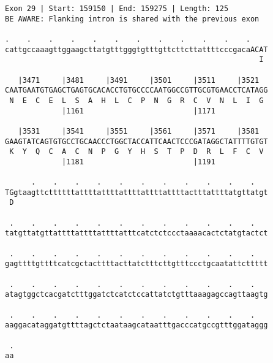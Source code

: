 \documentclass{article}
\begin{document}
\begin{Verbatim}
Exon 29 | Start: 159150 | End: 159275 | Length: 125
BE AWARE: Flanking intron is shared with the previous exon
 
.    .    .    .    .    .    .    .    .    .    .    .    
cattgccaaagttggaagcttatgtttgggtgtttgttcttcttattttcccgacaACAT
                                                          I 
  
   |3471     |3481     |3491     |3501     |3511     |3521  
CAATGAATGTGAGCTGAGTGCACACCTGTGCCCCAATGGCCGTTGCGTGAACCTCATAGG
 N  E  C  E  L  S  A  H  L  C  P  N  G  R  C  V  N  L  I  G 
             |1161                         |1171            
  
   |3531     |3541     |3551     |3561     |3571     |3581  
GAAGTATCAGTGTGCCTGCAACCCTGGCTACCATTCAACTCCCGATAGGCTATTTTGTGT
 K  Y  Q  C  A  C  N  P  G  Y  H  S  T  P  D  R  L  F  C  V 
             |1181                         |1191            
  
      .    .    .    .    .    .    .    .    .    .    .   
TGgtaagttcttttttattttattttattttattttattttactttattttatgttatgt
 D                                                          
  
 .    .    .    .    .    .    .    .    .    .    .    .   
tatgttatgttattttattttattttatttcatctctccctaaaacactctatgtactct
  
 .    .    .    .    .    .    .    .    .    .    .    .   
gagttttgttttcatcgctacttttacttatctttcttgtttccctgcaatattcttttt
  
 .    .    .    .    .    .    .    .    .    .    .    .   
atagtggctcacgatctttggatctcatctccattatctgtttaaagagccagttaagtg
  
 .    .    .    .    .    .    .    .    .    .    .    .   
aaggacataggatgttttagctctaataagcataatttgacccatgccgtttggataggg
  
 .
aa
\end{Verbatim}
\newpage
\end{document}
